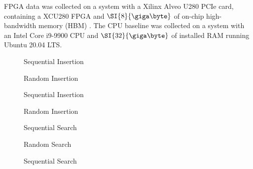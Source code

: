 
FPGA data was collected on a system with a Xilinx Alveo U280 PCIe card,
containing a XCU280 FPGA and $\SI{8}{\giga\byte}$ of on-chip high-bandwidth
memory (HBM) \autocite{u280}. The CPU baseline was collected on a system with an
Intel Core i9-9900 CPU and $\SI{32}{\giga\byte}$ of installed RAM running Ubuntu
20.04 LTS.




\begin{figure}[H]
	\centering
	
	\caption{Sequential Insertion}
	\label{fig:cpu-sequential-insertion}
\end{figure}

\begin{figure}[H]
	\centering
	
	\caption{Random Insertion}
	\label{fig:cpu-random-insertion}
\end{figure}



\begin{figure}[H]
	\centering
	
	\caption{Sequential Insertion}
	\label{fig:cpu-fanout-write}
\end{figure}

\begin{figure}[H]
	\centering
	
	\caption{Random Insertion}
	\label{fig:random-insertion}
\end{figure}



\begin{figure}[H]
	\centering
	
	\caption{Sequential Search}
	\label{fig:cpu-sequential-search}
\end{figure}

\begin{figure}[H]
	\centering
	
	\caption{Random Search}
	\label{fig:cpu-random-search}
\end{figure}



\begin{figure}[H]
	\centering
	
	\caption{Sequential Search}
	\label{fig:cpu-sequential-search}
\end{figure}


